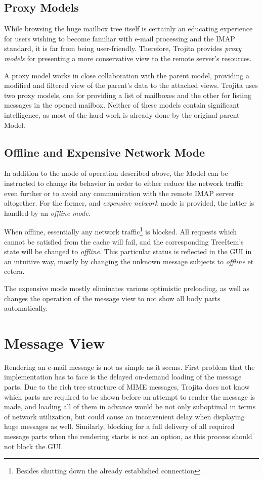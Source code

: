 \documentclass[12pt,notitlepage]{report}
\newcommand{\trojita}{Trojita\xspace}
\begin{document}
\subsection{Proxy Models}
\label{model-proxies}

While browsing the huge mailbox tree itself is certainly an educating experience
for users wishing to become familiar with e-mail processing and the IMAP
standard, it is far from being user-friendly.  Therefore, \trojita provides {\em
proxy models} for presenting a more conservative view to the remote server's
resources.

A proxy model works in close collaboration with the parent model, providing a
modified and filtered view of the parent's data to the attached views.  \trojita
uses two proxy models, one for providing a list of mailboxes and the other for
listing messages in the opened mailbox.  Neither of these models contain
significant intelligence, as most of the hard work is already done by the
original parent Model.

\subsection{Offline and Expensive Network Mode}

In addition to the mode of operation described above, the Model can be
instructed to change its behavior in order to either reduce the network traffic
even further or to avoid any communication with the remote IMAP server
altogether.  For the former, and {\em expensive network} mode is provided, the
latter is handled by an {\em offline mode}.

When offline, essentially any network traffic\footnote{Besides shutting down the
already established connection} is blocked.  All requests which cannot be
satisfied from the cache will fail, and the corresponding TreeItem's state will
be changed to {\em offline}.  This particular status is reflected in the GUI in
an intuitive way, mostly by changing the unknown message subjects to {\em
offline} et cetera.

The expensive mode mostly eliminates various optimistic preloading, as well as
changes the operation of the message view to not show all body parts
automatically.

\section{Message View}
\label{message-view}

Rendering an e-mail message is not as simple as it seems.  First problem that
the implementation has to face is the delayed on-demand loading of the message
parts.  Due to the rich tree structure of MIME messages, \trojita does not know
which parts are required to be shown before an attempt to render the message is
made, and loading all of them in advance would be not only suboptimal in terms
of network utilization, but could cause an inconvenient delay when displaying
huge messages as well.  Similarly, blocking for a full delivery of all required
message parts when the rendering starts is not an option, as this process should
not block the GUI.
\end{document}
